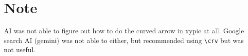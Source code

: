 \documentclass{article} %
\begin{document}
\section{Note}
AI was not able to figure out how to do the curved arrow in xypic at all. Google search AI (gemini) was not able to either, but recommended using \verb|\crv| but was not useful.
\end{document}
